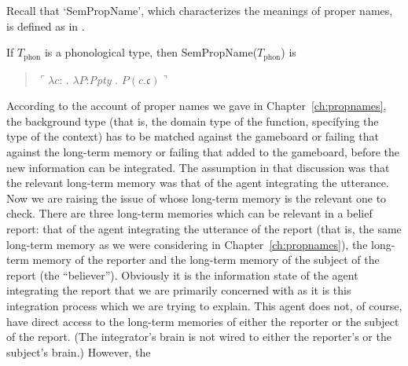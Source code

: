 Recall that `SemPropName', which characterizes the meanings of proper
names, is defined as in \nexteg{}.
\begin{ex}
  If $T_{\text{phon}}$ is a phonological type, then SemPropName($T_{\text{phon}}$) is
  \begin{quote}
    $\ulcorner\lambda c$:  . $\lambda
    P$:\textit{Ppty} . $P(c.\mathfrak{c})\urcorner$
  \end{quote}
                 
\end{ex} 
According to the account of proper names we gave in Chapter~\ref{ch:propnames}, the
background type (that is, the domain type of the function, specifying
the type of the context) has to be matched against the gameboard or
failing that against the long-term memory or failing that added to the gameboard,
before the new information can be integrated.  The assumption in that
discussion was that the relevant long-term memory was that of the
agent integrating the utterance. Now we are raising the issue of whose
long-term memory is the relevant one to check.  There are three
long-term memories which can be relevant in a belief report: that of
the agent integrating the utterance of the report (that is, the same
long-term memory as we were considering in
Chapter~\ref{ch:propnames}), the long-term memory of the reporter and
the long-term memory of the subject of the report (the ``believer'').
Obviously it is the information state of the agent integrating the
report that we are primarily concerned with as it is this integration
process which we are trying to explain.  This agent does not, of
course, have direct access to the long-term memories of either the
reporter or the subject of the report.  (The integrator's brain is not
wired to either the reporter's or the subject's brain.)  However, the
